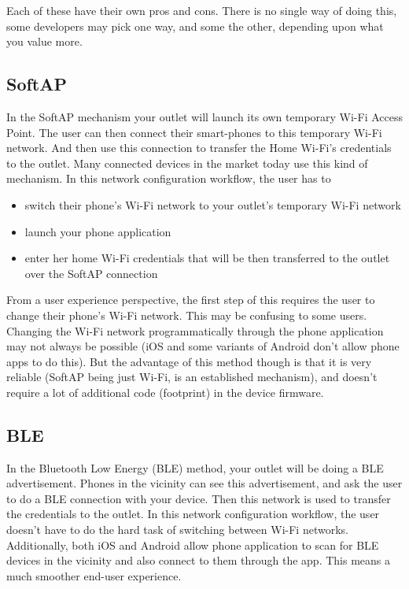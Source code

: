 \documentclass[main.tex]{subfiles}
\begin{document}
Each of these have their own pros and cons. There is no single way of doing this, some developers may pick one way, and some the other, depending upon what you value more.

\subsection{SoftAP}
In the SoftAP mechanism your outlet will launch its own temporary Wi-Fi Access Point. The user can then connect their smart-phones to this temporary Wi-Fi network. And then use this connection to transfer the Home Wi-Fi's credentials to the outlet. Many connected devices in the market today use this kind of mechanism. In this network configuration workflow, the user has to 
\begin{itemize}
    \item switch their phone's Wi-Fi network to your outlet's temporary Wi-Fi network
    \item launch your phone application
    \item enter her home Wi-Fi credentials that will be then transferred to the outlet over the SoftAP connection
\end{itemize}
From a user experience perspective, the first step of this requires the user to change their phone's Wi-Fi network. This may be confusing to some users. Changing the Wi-Fi network programmatically through the phone application may not always be possible (iOS and some variants of Android don't allow phone apps to do this).
But the advantage of this method though is that it is very reliable (SoftAP being just Wi-Fi, is an established mechanism), and doesn't require a lot of additional code (footprint) in the device firmware.

\subsection{BLE}

In the Bluetooth Low Energy (BLE) method, your outlet will be doing a BLE advertisement. Phones in the vicinity can see this advertisement, and ask the user to do a BLE connection with your device. Then this network is used to transfer the credentials to the outlet.
In this network configuration workflow, the user doesn't have to do the hard task of switching between Wi-Fi networks. Additionally, both iOS and Android allow phone application to scan for BLE devices in the vicinity and also connect to them through the app. This means a much smoother end-user experience.
\end{document}
